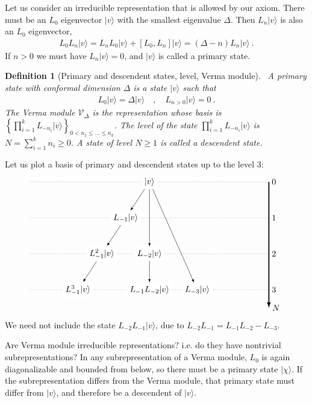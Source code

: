 \documentclass[12pt, a4paper]{article}
\theoremstyle{break}
\newtheorem{defn}[exo]{Definition}
\begin{document}
Let us consider an irreducible representation that is allowed by our axiom. There must be an $L_0$ eigenvector $|v\rangle$ with the smallest eigenvalue $\Delta$. Then $L_n|v\rangle$ is also an $L_0$ eigenvector,
\begin{align}
 L_0 L_n|v\rangle = L_nL_0|v\rangle + [L_0, L_n] |v\rangle  = (\Delta-n)L_n|v\rangle \ .
\end{align}
If $n>0$ we must have $L_n|v\rangle =0$, and $|v\rangle $ is called a primary state.

\begin{defn}[Primary and descendent states, level, Verma module]
 ~\label{def:prim}
 A primary state with conformal dimension $\Delta$ is a state $|v\rangle$ such that 
 \begin{align}
  L_0 |v\rangle = \Delta |v\rangle \quad , \quad L_{n>0} |v\rangle = 0\ .
 \end{align}
The Verma module $\mathcal V_\Delta$ is the representation whose basis is 
 $
 \left\{ \prod_{i=1}^k L_{-n_i} |v\rangle\right\}_{ 0<n_1\leq \dots \leq n_k}
 $.
The level of the state $\prod_{i=1}^k L_{-n_i} |v\rangle $ is $N=\sum_{i=1}^k n_i\geq 0$. A state of level $N\geq 1$ is called a descendent state.
\end{defn}
Let us plot a basis of primary and descendent states up to the level $3$:
\begin{align}
 \begin{tikzpicture}[scale = .25, baseline=(current  bounding  box.center)]
  \draw[-latex, very thick] (20, 0) -- (20, -21) node [right] {$N$};
  \foreach \x in {0, ..., 3}
  {
  \draw [dotted] (-20, {-6*\x}) -- (20, {-6*\x}) node [right] {${\x}$};
  }
  \node[fill = white] at (0, 0) (0) {$|v\rangle$};
  \node[fill = white] at (-4,-6) (1) {$L_{-1}|v\rangle$};
  \node[fill = white] at (-8, -12) (11) {$L_{-1}^2|v\rangle$};
  \node[fill = white] at (-12, -18) (111) {$L_{-1}^3|v\rangle$};
  \node[fill = white] at (0,-12) (2) {$L_{-2}|v\rangle$};
  \node[fill = white] at (0,-18) (12) {$L_{-1}L_{-2}|v\rangle$};
  \node[fill = white] at (8,-18) (3) {$L_{-3}|v\rangle$};
  \draw[-latex] (0) -- (1);
  \draw[-latex] (1) -- (11);
  \draw[-latex] (11) -- (111);
  \draw[-latex] (0) -- (2);
  \draw[-latex] (0) -- (3);
  \draw[-latex] (2) -- (12);
 \end{tikzpicture}
\end{align}
We need not include the state $L_{-2}L_{-1}|v\rangle$, due to $L_{-2}L_{-1} = L_{-1}L_{-2} - L_{-3}$.

Are Verma module irreducible representations? i.e. do they have nontrivial subrepresentations? In any subrepresentation of a Verma module, $L_0$ is again diagonalizable and bounded from below, so there must be a primary state $|\chi\rangle$. If the subrepresentation differs from the Verma module, that primary state must differ from $|v\rangle$, and therefore be a descendent of $|v\rangle$.
\end{document}
